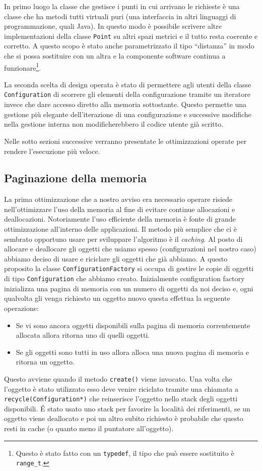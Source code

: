 \documentclass[a4paper, 10pt]{article}
\begin{document}
In primo luogo la classe che gestisce i punti in cui arrivano le 
richieste è una classe che ha metodi tutti virtuali puri (una interfaccia 
in altri linguaggi di programmazione, quali Java). In questo modo è possibile
scrivere altre implementazioni della classe \texttt{Point} su altri spazi 
metrici e il tutto resta coerente e corretto. A questo scopo è stato anche 
parametrizzato il tipo ``distanza'' in modo che si possa sostituire con un 
altra e la componente software continua a funzionare\footnote{Questo è stato 
fatto con un \texttt{typedef}, il tipo che può essere sostituito è 
\texttt{range\_t}.}.

La seconda scelta di design operata è stato di permettere agli utenti della 
classe \texttt{Configuration} di scorrere gli elementi della configurazione
tramite un iteratore invece che dare accesso diretto alla memoria sottostante.
Questo permette una gestione più elegante dell'iterazione di una configurazione
e successive modifiche nella gestione interna non modificherebbero il codice
utente già scritto. 

Nelle sotto sezioni successive verranno presentate le ottimizzazioni operate
per rendere l'esecuzione più veloce. 

\subsection{Paginazione della memoria}
La prima ottimizzazione che a nostro avviso era necessario operare risiede 
nell'ottimizzare l'uso della memoria al fine di evitare continue allocazioni e
deallocazioni. Notoriamente l'uso efficiente della memoria è fonte di grande
ottimizzazione all'interno delle applicazioni. Il metodo più semplice che 
ci è sembrato opportuno usare per sviluppare l'algoritmo è il \emph{caching}.
Al posto di allocare e deallocare gli oggetti che usiamo spesso (configurazioni
nel nostro caso) abbiamo deciso di usare e riciclare gli oggetti che già abbiamo.
A questo proposito la classe \texttt{ConfigurationFactory} si occupa di gestire
le copie di oggetti di tipo \texttt{Configuration} che abbiamo creato. 
Inizialmente configuration factory inizializza una pagina di memoria con 
un numero di oggetti da noi deciso e, ogni qualvolta gli venga richiesto un 
oggetto nuovo questa effettua la seguente operazione:
\begin{itemize}
  \item Se vi sono ancora oggetti disponibili sulla pagina di memoria correntemente
  allocata allora ritorna uno di quelli oggetti.
  \item Se gli oggetti sono tutti in uso allora alloca una nuova pagina di 
  memoria e ritorna un oggetto.
\end{itemize}
Questo avviene quando il metodo \texttt{create()} viene invocato. Una volta 
che l'oggetto è stato utilizzato esso deve venire riciclato tramite una 
chiamata a \texttt{recycle(Configuration*)} che reinserisce l'oggetto nello 
stack degli oggetti disponibili. \'E stato usato uno stack per favorire la 
località dei riferimenti, se un oggetto viene deallocato e poi un altro 
subito richiesto è probabile che questo resti in cache (o quanto meno il 
puntatore all'oggetto).
\end{document}
